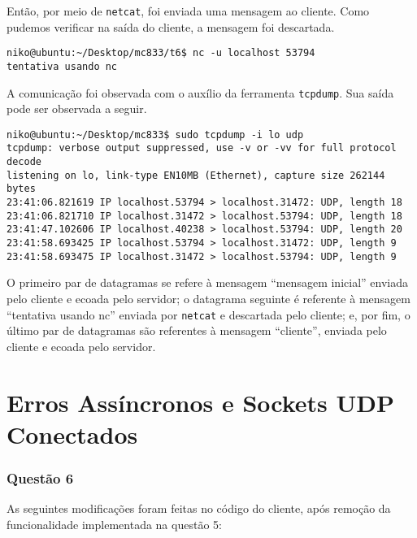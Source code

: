\documentclass[a4paper,10pt]{article}
\begin{document}
Então, por meio de {\tt netcat}, foi enviada uma mensagem ao cliente. Como pudemos verificar na saída do cliente, a mensagem foi descartada.

\begin{lstlisting}
niko@ubuntu:~/Desktop/mc833/t6$ nc -u localhost 53794
tentativa usando nc

\end{lstlisting}

A comunicação foi observada com o auxílio da ferramenta {\tt tcpdump}. Sua saída pode ser observada a seguir.

\begin{lstlisting}
niko@ubuntu:~/Desktop/mc833$ sudo tcpdump -i lo udp
tcpdump: verbose output suppressed, use -v or -vv for full protocol decode
listening on lo, link-type EN10MB (Ethernet), capture size 262144 bytes
23:41:06.821619 IP localhost.53794 > localhost.31472: UDP, length 18
23:41:06.821710 IP localhost.31472 > localhost.53794: UDP, length 18
23:41:47.102606 IP localhost.40238 > localhost.53794: UDP, length 20
23:41:58.693425 IP localhost.53794 > localhost.31472: UDP, length 9
23:41:58.693475 IP localhost.31472 > localhost.53794: UDP, length 9

\end{lstlisting}

O primeiro par de datagramas se refere à mensagem ``mensagem inicial'' enviada pelo cliente e ecoada pelo servidor; o datagrama seguinte é referente à mensagem ``tentativa usando nc'' enviada por {\tt netcat} e descartada pelo cliente; e, por fim, o último par de datagramas são referentes à mensagem ``cliente'', enviada pelo cliente e ecoada pelo servidor.

\part{Erros Assíncronos e Sockets UDP Conectados}
\section{Questão 6}

As seguintes modificações foram feitas no código do cliente, após remoção da funcionalidade implementada na questão 5:
\end{document}
